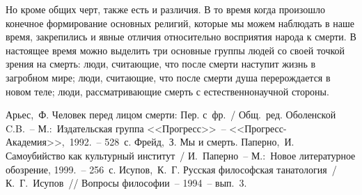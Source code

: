 \documentclass[pscyr,titlepage]{hedreport}
\begin{document}
  Но кроме общих черт, также есть и различия. В то время когда произошло
  конечное формирование основных религий, которые мы можем наблюдать в наше
  время, закрепились и явные отличия относительно восприятия народа к смерти. В
  настоящее время можно выделить три основные группы людей со своей точкой
  зрения на смерть: люди, считающие, что после смерти наступит жизнь в
  загробном мире; люди, считающие, что после смерти душа перерождается в
  новом теле; люди, рассматривающие смерть с естественнонаучной стороны.

  \pagebreak

  \renewcommand{\bibname}{Список литературы}
  \begin{thebibliography}{9}
     Арьес,~Ф. Человек перед лицом смерти: Пер. с~фр.~/ Общ.~ред.
      Оболенской C.B.~-- М.:~Издательская группа <<Прогресс>>~--
      <<Прогресс-Академия>>,~1992.~-- 528~с.
     Фрейд,~З. Мы и смерть.
     Паперно,~И. Самоубийство как культурный институт~/ И.~Паперно~--
      М.:~Новое литературное обозрение, 1999.~-- 256~с.
     Исупов,~К.~Г. Русская философская танатология~/ К.~Г.~Исупов~//
      Вопросы философии~-- 1994~-- вып.~3.
  \end{thebibliography}
\end{document}
